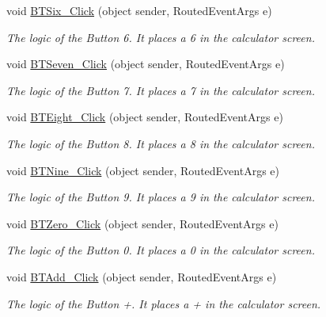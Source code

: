 \begin{DoxyCompactItemize}
void \mbox{\hyperlink{class_p_a_c4_______calculadora_1_1_main_window_ad6208374e2b207e68156e38e6e1eb4d1}{B\+T\+Six\+\_\+\+Click}} (object sender, Routed\+Event\+Args e)
\begin{DoxyCompactList}\small\item\em The logic of the Button 6. It places a 6 in the calculator screen. \end{DoxyCompactList}\item 
void \mbox{\hyperlink{class_p_a_c4_______calculadora_1_1_main_window_ac6290da671498c9bc01ecc4deef41972}{B\+T\+Seven\+\_\+\+Click}} (object sender, Routed\+Event\+Args e)
\begin{DoxyCompactList}\small\item\em The logic of the Button 7. It places a 7 in the calculator screen. \end{DoxyCompactList}\item 
void \mbox{\hyperlink{class_p_a_c4_______calculadora_1_1_main_window_a09bee2b6053b481bc0e202277af42890}{B\+T\+Eight\+\_\+\+Click}} (object sender, Routed\+Event\+Args e)
\begin{DoxyCompactList}\small\item\em The logic of the Button 8. It places a 8 in the calculator screen. \end{DoxyCompactList}\item 
void \mbox{\hyperlink{class_p_a_c4_______calculadora_1_1_main_window_af146fbab792e00236730856369d69bcc}{B\+T\+Nine\+\_\+\+Click}} (object sender, Routed\+Event\+Args e)
\begin{DoxyCompactList}\small\item\em The logic of the Button 9. It places a 9 in the calculator screen. \end{DoxyCompactList}\item 
void \mbox{\hyperlink{class_p_a_c4_______calculadora_1_1_main_window_ab862d5f81c38770faacbfa15cede92dc}{B\+T\+Zero\+\_\+\+Click}} (object sender, Routed\+Event\+Args e)
\begin{DoxyCompactList}\small\item\em The logic of the Button 0. It places a 0 in the calculator screen. \end{DoxyCompactList}\item 
void \mbox{\hyperlink{class_p_a_c4_______calculadora_1_1_main_window_af87aaed6d16cab4759642fb55f75a241}{B\+T\+Add\+\_\+\+Click}} (object sender, Routed\+Event\+Args e)
\begin{DoxyCompactList}\small\item\em The logic of the Button +. It places a + in the calculator screen. \end{DoxyCompactList}\item 

\end{DoxyCompactItemize}
